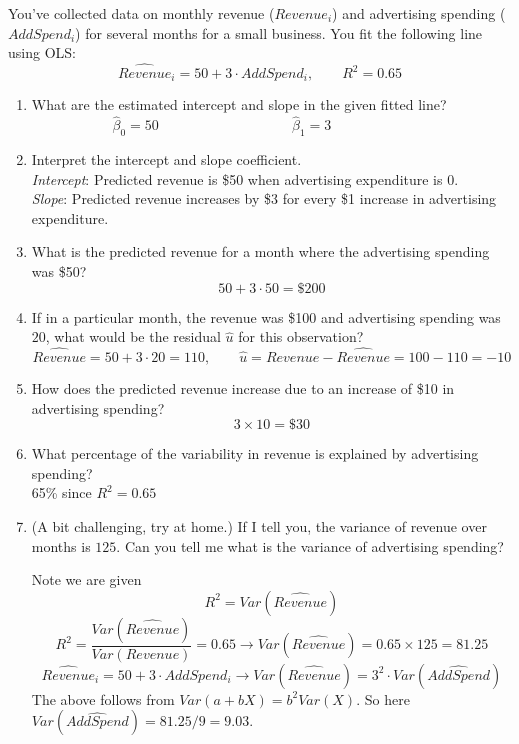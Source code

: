 \documentclass{./../../Latex/handout}
\begin{document}
You've collected data on monthly revenue ($Revenue_i$) and advertising spending ($AddSpend_i$) for several months for a small business. You fit the following line using OLS: 
\[ \hat{Revenue}_i = 50 + 3 \cdot AddSpend_i, \quad \quad R^2 =0.65 \]
\begin{enumerate}
    \item What are the estimated intercept and slope in the given fitted line?
    $$\hat{\beta}_0 = 50 \hspace{4cm} \hat{\beta}_1 = 3 \hspace{3cm} $$
    \item Interpret the intercept and slope coefficient. \\
    \textit{Intercept}: Predicted revenue is \$50 when advertising expenditure is 0.\\
    \textit{Slope}: Predicted revenue increases by \$3 for every \$1 increase in advertising expenditure.
    \item What is the predicted revenue for a month where the advertising spending was \$50?
       $$ 50 + 3 \cdot 50 = \$200 $$
    \item  If in a particular month, the revenue was \$100 and advertising spending was $20$, what would be the residual \( \hat{u} \) for this observation? 
    $$\hat{Revenue} = 50 + 3 \cdot 20 = 110, \quad \quad  \hat{u} = Revenue- \hat{Revenue} = 100-110=-10  $$
    \item  How does the predicted revenue increase due to an increase of \$10 in advertising spending? 
    $$ 3 \times 10 = \$ 30 $$
        
    \item  What percentage of the variability in revenue is explained by advertising spending? \\
    65\% since $R^2 = 0.65$
    \newpage
    \item (A bit challenging, try at home.) If I tell you, the variance of revenue over months is $125$. Can you tell me what is the variance of advertising spending? 
    
    Note we are given $$R^2 =Var(\hat{Revenue}) $$
     $$R^2 = \frac{Var(\hat{Revenue})}{Var(Revenue)} = 0.65 \rightarrow Var(\hat{Revenue}) = 0.65 \times 125 = 81.25  $$
     \[ \hat{Revenue}_i = 50 + 3 \cdot AddSpend_i \rightarrow  Var(\hat{Revenue}) = 3^2 \cdot Var(\hat{AddSpend}) \]
     The above follows from $Var(a + bX) = b^2 Var(X)$. So here $Var(\hat{AddSpend})=81.25/9 = 9.03$.
    \end{enumerate}
\end{document}
